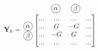 \documentclass[a4paper,twocolumn,10pt]{article}
\newcommand*\kreis[1]{\unitlength1ex\begin{picture}(2.5,2.5)%
\put(0.75,0.75){\circle{3}}\put(0.7,0.7){\makebox(0,0){#1}}\end{picture}}
\begin{document}
\hfill
\begin{minipage}[b]{0.4\textwidth}
$\textbf{Y}_k=\;\;\begin{matrix}\begin{matrix} & & \;\;\;\kreis{$\alpha$} & \;\;\;\kreis{$\beta$} & \end{matrix}\\\begin{matrix} \; \\ \kreis{$\alpha$} \\ \kreis{$\beta$} \\ \; \end{matrix} \left[\begin{matrix} ... & ... & ... & ... \\ ... & G & -G & ... \\ ... & -G & G & ... \\ ...& ... & ... & ... \end{matrix}\right]\\ \; \end{matrix}$\\
\end{minipage}
\end{document}
